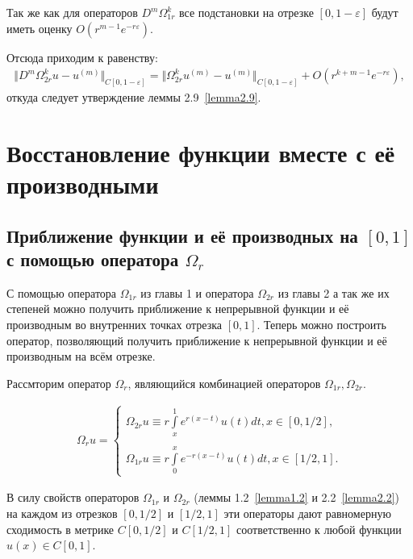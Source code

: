 Так же как для операторов $ D^m\Omega_{1r}^k $ все подстановки на отрезке $ [0,1-\varepsilon] $ будут иметь оценку $ O(r^{m-1}e^{-r\varepsilon}) $.

Отсюда приходим к равенству:
\begin{equation}
\begin{array}{c}
\nonumber

\Vert D^m\Omega_{2r}^ku - u^{(m)} \Vert_{C[0,1-\varepsilon]} = \Vert \Omega_{2r}^ku^{(m)} - u^{(m)} \Vert_{C[0,1-\varepsilon]} + O(r^{k+m-1}e^{-r\varepsilon}),

\end{array}
\end{equation}
откуда следует утверждение леммы 2.9~\eqref{lemma2.9}.

\chapter{Восстановление функции вместе с её производными}
\section{Приближение функции и её производных на $ [0,1] $ с помощью оператора $ \Omega_r $}
С помощью оператора $ \Omega_{1r} $ из главы 1 и оператора $ \Omega_{2r} $ из главы 2 а так же их степеней можно получить приближение к непрерывной функции и её производным во внутренних точках отрезка $ [0,1] $. Теперь можно построить оператор, позволяющий получить приближение к непрерывной функции и её производным на всём отрезке.

Рассмторим оператор $ \Omega_r $, являющийся комбинацией операторов $ \Omega_{1r}, \Omega_{2r} $.

\begin{equation}
\begin{array}{c}

\Omega_r u = \left\{
\begin{array}{l}
\Omega_{2r}u \equiv r\int\limits_x^1 e^{r(x-t)}u(t)dt, x \in [0,1/2], \\\\
\Omega_{1r}u \equiv r\int\limits_0^x e^{-r(x-t)}u(t)dt, x \in [1/2,1].
\end{array}
\right.

\end{array}
\end{equation}

В силу свойств операторов $ \Omega_{1r} $ и $ \Omega_{2r} $ (леммы 1.2~\eqref{lemma1.2} и 2.2~\eqref{lemma2.2}) на каждом из отрезков $ [0,1/2] $ и $ [1/2,1] $ эти операторы дают равномерную сходимость в метрике $ C[0,1/2] $ и $ C[1/2,1] $ соответственно к любой функции $ u(x) \in C[0,1] $.

